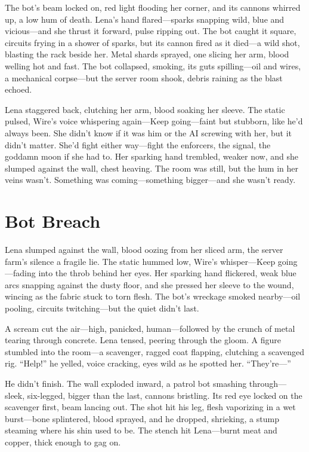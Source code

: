 \documentclass[12pt]{book}
\begin{document}
The bot’s beam locked on, red light flooding her corner, and its cannons whirred up, a low hum of death. Lena’s hand flared---sparks snapping wild, blue and vicious---and she thrust it forward, pulse ripping out. The bot caught it square, circuits frying in a shower of sparks, but its cannon fired as it died---a wild shot, blasting the rack beside her. Metal shards sprayed, one slicing her arm, blood welling hot and fast. The bot collapsed, smoking, its guts spilling---oil and wires, a mechanical corpse---but the server room shook, debris raining as the blast echoed.

Lena staggered back, clutching her arm, blood soaking her sleeve. The static pulsed, Wire’s voice whispering again---Keep going---faint but stubborn, like he’d always been. She didn’t know if it was him or the AI screwing with her, but it didn’t matter. She’d fight either way---fight the enforcers, the signal, the goddamn moon if she had to. Her sparking hand trembled, weaker now, and she slumped against the wall, chest heaving. The room was still, but the hum in her veins wasn’t. Something was coming---something bigger---and she wasn’t ready.

\section{Bot Breach}

Lena slumped against the wall, blood oozing from her sliced arm, the server farm’s silence a fragile lie. The static hummed low, Wire’s whisper---Keep going---fading into the throb behind her eyes. Her sparking hand flickered, weak blue arcs snapping against the dusty floor, and she pressed her sleeve to the wound, wincing as the fabric stuck to torn flesh. The bot’s wreckage smoked nearby---oil pooling, circuits twitching---but the quiet didn’t last.

A scream cut the air---high, panicked, human---followed by the crunch of metal tearing through concrete. Lena tensed, peering through the gloom. A figure stumbled into the room---a scavenger, ragged coat flapping, clutching a scavenged rig. ``Help!'' he yelled, voice cracking, eyes wild as he spotted her. ``They’re---''

He didn’t finish. The wall exploded inward, a patrol bot smashing through---sleek, six-legged, bigger than the last, cannons bristling. Its red eye locked on the scavenger first, beam lancing out. The shot hit his leg, flesh vaporizing in a wet burst---bone splintered, blood sprayed, and he dropped, shrieking, a stump steaming where his shin used to be. The stench hit Lena---burnt meat and copper, thick enough to gag on.
\end{document}
